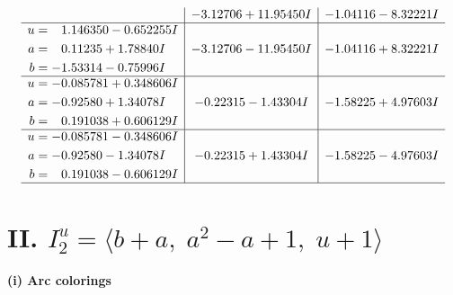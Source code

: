 \documentclass[1p]{elsarticle_modified}
\theoremstyle{definition}
\begin{document}
$$\begin{array}{c|c|c}
 & -3.12706 + 11.95450 I & -1.04116 - 8.32221 I \\ \hline\begin{aligned}
u &= \phantom{-}1.146350 - 0.652255 I \\
a &= \phantom{-}0.11235 + 1.78840 I \\
b &= -1.53314 - 0.75996 I\end{aligned}
 & -3.12706 - 11.95450 I & -1.04116 + 8.32221 I \\ \hline\begin{aligned}
u &= -0.085781 + 0.348606 I \\
a &= -0.92580 + 1.34078 I \\
b &= \phantom{-}0.191038 + 0.606129 I\end{aligned}
 & -0.22315 - 1.43304 I & -1.58225 + 4.97603 I \\ \hline\begin{aligned}
u &= -0.085781 - 0.348606 I \\
a &= -0.92580 - 1.34078 I \\
b &= \phantom{-}0.191038 - 0.606129 I\end{aligned}
 & -0.22315 + 1.43304 I & -1.58225 - 4.97603 I\\
 \hline 
 \end{array}$$\newpage\newpage\renewcommand{\arraystretch}{1}
\centering \section*{II. $I^u_{2}= \langle b+a,\;a^2- a+1,\;u+1 \rangle$}
\flushleft \textbf{(i) Arc colorings}\\
\end{document}
